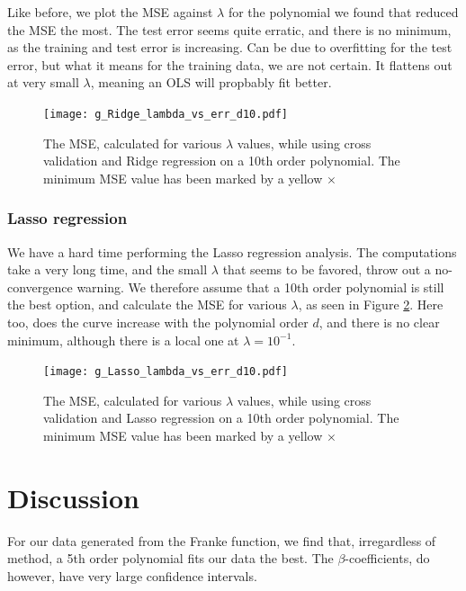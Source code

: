 \documentclass[a4paper,10pt,english]{article}
\begin{document}
Like before, we plot the MSE against $\lambda$ for the polynomial we found that reduced the MSE the most. The test error seems quite erratic, and there is no minimum, as the training and test error is increasing. Can be due to overfitting for the test error, but what it means for the training data, we are not certain. It flattens out at very small $\lambda$, meaning an OLS will propbably fit better.
\begin{figure}[H]
	\centering
	\texttt{[image: g\_Ridge\_lambda\_vs\_err\_d10.pdf]}
	\caption{The MSE, calculated for various $\lambda$ values, while using cross validation and Ridge regression on a 10th order polynomial. The minimum MSE value has been marked by a yellow $\times$}
	\label{fig:12}
\end{figure}

\subsubsection{Lasso regression}
We have a hard time performing the Lasso regression analysis. The computations take a very long time, and the small $\lambda$ that seems to be favored, throw out a no-convergence warning.
We therefore assume that a 10th order polynomial is still the best option, and calculate the MSE for various $\lambda$, as seen in Figure \ref{fig:13}. Here too,  does the curve increase with the polynomial order $d$, and there is no clear minimum, although there is a local one at $\lambda=10^{-1}$.
\begin{figure}[H]
	\centering
	\texttt{[image: g\_Lasso\_lambda\_vs\_err\_d10.pdf]}
	\caption{The MSE, calculated for various $\lambda$ values, while using cross validation and Lasso regression on a 10th order polynomial. The minimum MSE value has been marked by a yellow $\times$}
	\label{fig:13}
\end{figure}

\section{Discussion}\label{sec:discussion}
For our data generated from the Franke function, we find that, irregardless of method, a 5th order polynomial fits our data the best. The $\beta$-coefficients, do however, have very large confidence intervals.
\end{document}

